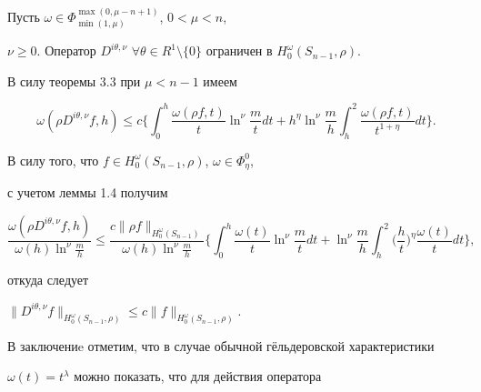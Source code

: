 \begin{thms}


Пусть $\omega \in \Phi_{\min(1,\mu)}^{\max(0, \mu-n+1)}$, $0 < \mu < n$,


$\nu\ge 0$. Оператор $D^{i\theta,\nu}$ $\forall \theta\in R^1\setminus


\{0\}$ ограничен в $H_0^\omega(S_{n-1},\rho)$.


\end{thms}





\begin{pf}


В силу теоремы 3.3 при $\mu<n-1$ имеем


$$


\omega(\rho D^{i\theta,\nu} f,h) \leq c \bigg\{ \int _0^h


\frac{\omega(\rho f,t)}{t} \ln^\nu \frac{m}{t} dt +


 h^{\eta} \ln^\nu \frac{m}{h} \int _h^2


\frac{\omega(\rho f,t)}{t^{1+\eta}} dt \bigg\} .


$$


В силу того, что $f\in H_0^\omega(S_{n-1},\rho)$, $\omega\in\Phi_{\eta}^0$,


с учетом леммы 1.4 получим


$$


\frac{\omega(\rho D^{i\theta,\nu} f,h)}{\omega(h)


\ln^\nu \frac{m}{h}}


\le \frac{c\|\rho f\|_{H_0^\omega(S_{n-1})}}{\omega(h)\ln^\nu


\frac{m}{h}}


\bigg\{ \int _0^h \frac{\omega(t)}{t}


\ln^\nu \frac{m}{t} dt +


\ln^\nu \frac{m}{h} \int _h^2 \bigg( \frac{h}{t} \bigg)^{\eta}


\frac{\omega(t)}{t} dt \bigg\},


$$


откуда следует


$\|D^{i\theta,\nu}f\|_{H_0^\omega(S_{n-1},\rho)} \leq c


\|f\|_{H_0^\omega(S_{n-1},\rho)}.$





В заключениe отметим, что в случае обычной г\"ельдеровской характеристики


$\omega (t)=t^\lambda$ можно показать, что для действия оператора



\end{pf}
